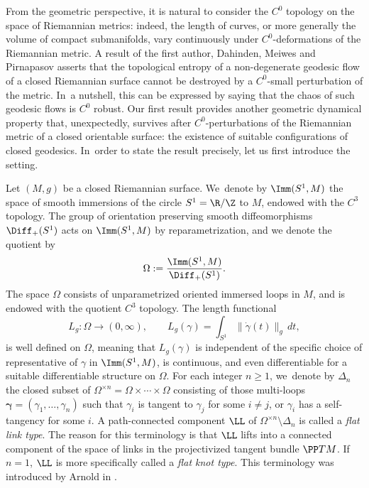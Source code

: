 From the geometric perspective, it is natural to consider the $C^0$ topology on the space of Riemannian metrics: indeed, the length of curves, or more generally the volume of compact submanifolds, vary continuously under $C^0$-deformations of the Riemannian metric.
A result of the first author, Dahinden, Meiwes and Pirnapasov \cite{Alves:2023aa} asserts that the topological entropy of a non-degenerate geodesic flow of a closed Riemannian surface cannot be destroyed by a $C^0$-small perturbation of the metric. In~a nutshell, this can be expressed by saying that the chaos of such geodesic flows is $C^0$ robust.
Our first result provides another geometric dynamical property that, unexpectedly, survives after $C^0$-perturbations of the Riemannian metric of a closed orientable surface: the existence of suitable configurations of closed geodesics. In~order to state the result precisely, let us first introduce the setting.

Let $(M,g)$ be a closed Riemannian surface. We~denote by $\Imm(S^1,M)$ the space of smooth immersions of the circle $S^1=\R/\Z$ to $M$, endowed with the $C^3$ topology. The group of orientation preserving smooth diffeomorphisms $\Diff_+(S^1)$ acts on $\Imm(S^1,M)$ by reparametrization, and we denote the quotient by
\[
\Omega:=\frac{\Imm(S^1,M)}{\Diff_+(S^1)}.
\]
The space $\Omega$ consists of unparametrized oriented immersed loops in $M$, and is endowed with the quotient $C^3$ topology.
The length functional
\[
L_g:\Omega\to(0,\infty),\qquad L_g(\gamma)=\int_{S^1} \|\dot\gamma(t)\|_g\,dt,
\]
is well defined on $\Omega$, meaning that $L_g(\gamma)$ is independent of the specific choice of representative of $\gamma$ in $\Imm(S^1,M)$, is continuous, and even differentiable for a suitable differentiable structure on $\Omega$.
For each integer $n\geq1$, we~denote by $\Delta_n$ the closed subset of $\Omega^{\times n}=\Omega\times\cdots\times\Omega$ consisting of those multi-loops $\bm\gamma=(\gamma_1,\dots,\gamma_n)$ such that $\gamma_i$ is tangent to $\gamma_j$ for some $i\neq j$, or $\gamma_i$ has a self-tangency for some $i$.
A path-connected component $\LL$ of $\Omega^{\times n}\setminus\Delta_n$ is called a \emph{flat link type}. The reason for this terminology is that $\LL$ lifts into a connected component of the space of links in the projectivized tangent bundle $\PP TM$. If $n=1$, $\LL$ is more specifically called a \emph{flat knot type}. This terminology was introduced by Arnold in \cite{Arnold:1994aa}.

